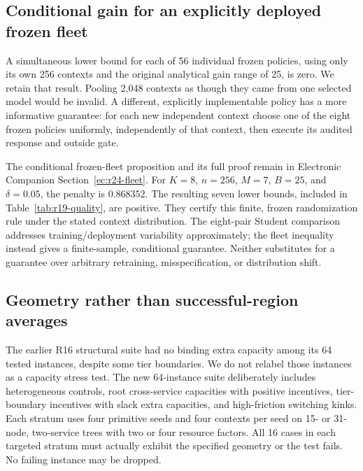 \documentclass[11pt,letterpaper]{article}
\theoremstyle{definition}
\newcommand{\1}{\mathbf 1}
\begin{document}
\subsection{Conditional gain for an explicitly deployed frozen fleet}
A simultaneous lower bound for each of 56 individual frozen policies, using only its own 256 contexts and the original analytical gain range of 25, is zero. We retain that result. Pooling 2,048 contexts as though they came from one selected model would be invalid. A different, explicitly implementable policy has a more informative guarantee: for each new independent context choose one of the eight frozen policies uniformly, independently of that context, then execute its audited response and outside gate.

The conditional frozen-fleet proposition and its full proof remain in Electronic Companion Section~\ref{ec:r24-fleet}.
For $K=8$, $n=256$, $M=7$, $B=25$, and $\delta=0.05$, the penalty is $0.868352$. The resulting seven lower bounds, included in Table~\ref{tab:r19-quality}, are positive. They certify this finite, frozen randomization rule under the stated context distribution. The eight-pair Student comparison addresses training/deployment variability approximately; the fleet inequality instead gives a finite-sample, conditional guarantee. Neither substitutes for a guarantee over arbitrary retraining, misspecification, or distribution shift.

\subsection{Geometry rather than successful-region averages}
The earlier R16 structural suite had no binding extra capacity among its 64 tested instances, despite some tier boundaries. We do not relabel those instances as a capacity stress test. The new 64-instance suite deliberately includes heterogeneous controls, root cross-service capacities with positive incentives, tier-boundary incentives with slack extra capacities, and high-friction switching kinks. Each stratum uses four primitive seeds and four contexts per seed on 15- or 31-node, two-service trees with two or four resource factors. All 16 cases in each targeted stratum must actually exhibit the specified geometry or the test fails. No failing instance may be dropped.
\end{document}
